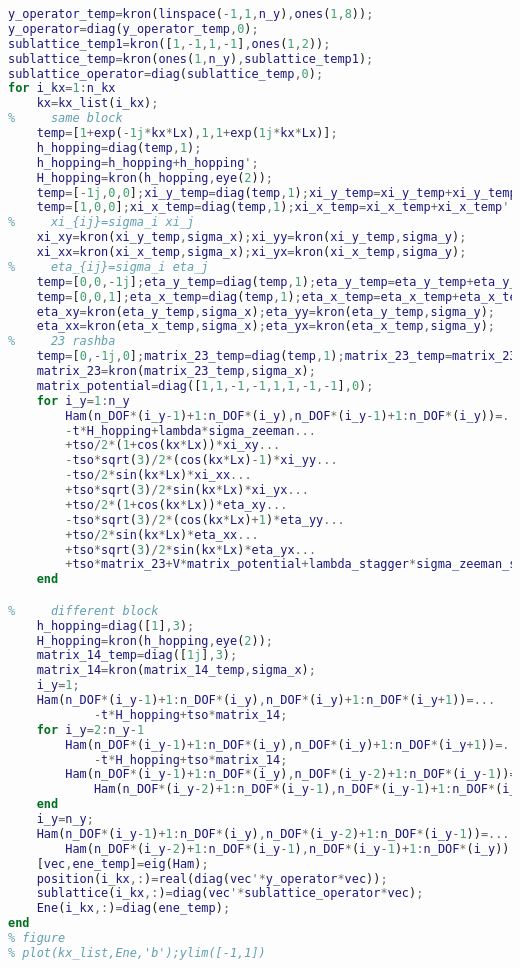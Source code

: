 \begin{lstlisting}[language=matlab]
y_operator_temp=kron(linspace(-1,1,n_y),ones(1,8));
y_operator=diag(y_operator_temp,0);
sublattice_temp1=kron([1,-1,1,-1],ones(1,2));
sublattice_temp=kron(ones(1,n_y),sublattice_temp1);
sublattice_operator=diag(sublattice_temp,0);
for i_kx=1:n_kx
    kx=kx_list(i_kx);
%     same block
    temp=[1+exp(-1j*kx*Lx),1,1+exp(1j*kx*Lx)];
    h_hopping=diag(temp,1);
    h_hopping=h_hopping+h_hopping';
    H_hopping=kron(h_hopping,eye(2));
    temp=[-1j,0,0];xi_y_temp=diag(temp,1);xi_y_temp=xi_y_temp+xi_y_temp';
    temp=[1,0,0];xi_x_temp=diag(temp,1);xi_x_temp=xi_x_temp+xi_x_temp';
%     xi_{ij}=sigma_i xi_j
    xi_xy=kron(xi_y_temp,sigma_x);xi_yy=kron(xi_y_temp,sigma_y);
    xi_xx=kron(xi_x_temp,sigma_x);xi_yx=kron(xi_x_temp,sigma_y);
%     eta_{ij}=sigma_i eta_j
    temp=[0,0,-1j];eta_y_temp=diag(temp,1);eta_y_temp=eta_y_temp+eta_y_temp';
    temp=[0,0,1];eta_x_temp=diag(temp,1);eta_x_temp=eta_x_temp+eta_x_temp';
    eta_xy=kron(eta_y_temp,sigma_x);eta_yy=kron(eta_y_temp,sigma_y);
    eta_xx=kron(eta_x_temp,sigma_x);eta_yx=kron(eta_x_temp,sigma_y);
%     23 rashba
    temp=[0,-1j,0];matrix_23_temp=diag(temp,1);matrix_23_temp=matrix_23_temp+matrix_23_temp';
    matrix_23=kron(matrix_23_temp,sigma_x);
    matrix_potential=diag([1,1,-1,-1,1,1,-1,-1],0);
    for i_y=1:n_y
        Ham(n_DOF*(i_y-1)+1:n_DOF*(i_y),n_DOF*(i_y-1)+1:n_DOF*(i_y))=...
        -t*H_hopping+lambda*sigma_zeeman...
        +tso/2*(1+cos(kx*Lx))*xi_xy...
        -tso*sqrt(3)/2*(cos(kx*Lx)-1)*xi_yy...
        -tso/2*sin(kx*Lx)*xi_xx...
        +tso*sqrt(3)/2*sin(kx*Lx)*xi_yx...
        +tso/2*(1+cos(kx*Lx))*eta_xy...
        -tso*sqrt(3)/2*(cos(kx*Lx)+1)*eta_yy...
        +tso/2*sin(kx*Lx)*eta_xx...
        +tso*sqrt(3)/2*sin(kx*Lx)*eta_yx...
        +tso*matrix_23+V*matrix_potential+lambda_stagger*sigma_zeeman_stagger;
    end

%     different block
    h_hopping=diag([1],3);
    H_hopping=kron(h_hopping,eye(2));
    matrix_14_temp=diag([1j],3);
    matrix_14=kron(matrix_14_temp,sigma_x);
    i_y=1;
    Ham(n_DOF*(i_y-1)+1:n_DOF*(i_y),n_DOF*(i_y)+1:n_DOF*(i_y+1))=...
            -t*H_hopping+tso*matrix_14;
    for i_y=2:n_y-1
        Ham(n_DOF*(i_y-1)+1:n_DOF*(i_y),n_DOF*(i_y)+1:n_DOF*(i_y+1))=...
            -t*H_hopping+tso*matrix_14;
        Ham(n_DOF*(i_y-1)+1:n_DOF*(i_y),n_DOF*(i_y-2)+1:n_DOF*(i_y-1))=...
            Ham(n_DOF*(i_y-2)+1:n_DOF*(i_y-1),n_DOF*(i_y-1)+1:n_DOF*(i_y))';
    end
    i_y=n_y;
    Ham(n_DOF*(i_y-1)+1:n_DOF*(i_y),n_DOF*(i_y-2)+1:n_DOF*(i_y-1))=...
        Ham(n_DOF*(i_y-2)+1:n_DOF*(i_y-1),n_DOF*(i_y-1)+1:n_DOF*(i_y))';
    [vec,ene_temp]=eig(Ham);
    position(i_kx,:)=real(diag(vec'*y_operator*vec));
    sublattice(i_kx,:)=diag(vec'*sublattice_operator*vec);
    Ene(i_kx,:)=diag(ene_temp);
end
% figure
% plot(kx_list,Ene,'b');ylim([-1,1])


\end{lstlisting}
